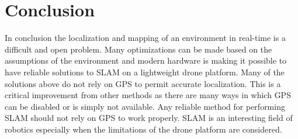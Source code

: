 \documentclass[conference]{IEEEtran}
\begin{document}
\section{Conclusion}
In conclusion the localization and mapping of an environment in real-time is a difficult and open problem. Many optimizations can be made based on the assumptions of the environment and modern hardware is making it possible to have reliable solutions to SLAM on a lightweight drone platform. Many of the solutions above do not rely on GPS to permit accurate localization. This is a critical improvement from other methods as there are many ways in which GPS can be disabled or is simply not available. Any reliable method for performing SLAM should not rely on GPS to work properly. SLAM is an interesting field of robotics especially when the limitations of the drone platform are considered.




\end{document}
